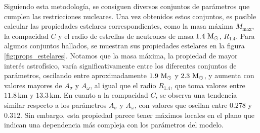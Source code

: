 Siguiendo esta metodología, se consiguen diversos conjuntos de parámetros que cumplen las restricciones nucleares. Una vez obtenidos estos conjuntos, es posible calcular las propiedades estelares correspondientes, como la masa máxima $M_\text{max}$, la compacidad $C$ y el radio de estrellas de neutrones de masa $1.4 \, \,\text{M}_\odot$, $R_{1.4}$. Para algunos conjuntos hallados, se muestran sus propiedades estelares en la figura \ref{fig:props_estelares}. Notamos que la masa máxima, la propiedad de mayor interés astrofísico, varía significativamente entre los diferentes conjuntos de parámetros, oscilando entre aproximadamente $1.9 \, \,\text{M}_\odot$ y $2.3 \, \,\text{M}_\odot$, y aumenta con valores mayores de $A_\sigma$ y $A_\omega$, al igual que el radio $R_{1.4}$, que toma valores entre $11.8 \, \text{km}$ y $13.3 \, \text{km}$. En cuanto a la compacidad $C$, se observa una tendencia similar respecto a los parámetros $A_\sigma$ y $A_\omega$, con valores que oscilan entre $0.278$ y $0.312$. Sin embargo, esta propiedad parece tener máximos locales en el plano que indican una dependencia más compleja con los parámetros del modelo.

